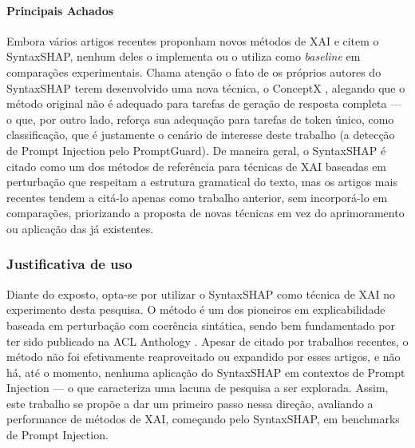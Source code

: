 \paragraph{Principais Achados} Embora vários artigos recentes proponham novos métodos de XAI e citem o SyntaxSHAP, nenhum deles o implementa ou o utiliza como \textit{baseline} em comparações experimentais. Chama atenção o fato de os próprios autores do SyntaxSHAP terem desenvolvido uma nova técnica, o ConceptX \parencite{amara2025conceptlevel}, alegando que o método original não é adequado para tarefas de geração de resposta completa — o que, por outro lado, reforça sua adequação para tarefas de token único, como classificação, que é justamente o cenário de interesse deste trabalho (a detecção de Prompt Injection pelo PromptGuard). De maneira geral, o SyntaxSHAP é citado como um dos métodos de referência para técnicas de XAI baseadas em perturbação que respeitam a estrutura gramatical do texto, mas os artigos mais recentes tendem a citá-lo apenas como trabalho anterior, sem incorporá-lo em comparações, priorizando a proposta de novas técnicas em vez do aprimoramento ou aplicação das já existentes.

\subsubsection{Justificativa de uso}

Diante do exposto, opta-se por utilizar o SyntaxSHAP como técnica de XAI no experimento desta pesquisa. O método é um dos pioneiros em explicabilidade baseada em perturbação com coerência sintática, sendo bem fundamentado por ter sido publicado na ACL Anthology \parencite{amara2024syntaxshap}. Apesar de citado por trabalhos recentes, o método não foi efetivamente reaproveitado ou expandido por esses artigos, e não há, até o momento, nenhuma aplicação do SyntaxSHAP em contextos de Prompt Injection — o que caracteriza uma lacuna de pesquisa a ser explorada. Assim, este trabalho se propõe a dar um primeiro passo nessa direção, avaliando a performance de métodos de XAI, começando pelo SyntaxSHAP, em benchmarks de Prompt Injection.
